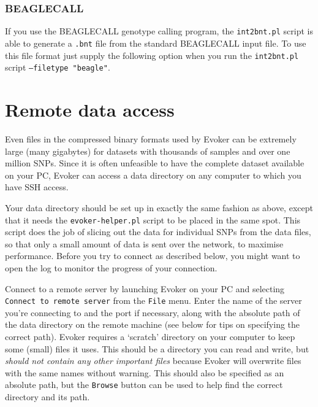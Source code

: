 \documentclass{article}
\begin{document}
\subsubsection{BEAGLECALL}
If you use the BEAGLECALL genotype calling program, the \texttt{int2bnt.pl} script is able to generate a \texttt{.bnt} file from the standard BEAGLECALL input file. To use this file format just supply the following option when you run the \texttt{int2bnt.pl} script \texttt{--filetype "beagle"}.

\section{Remote data access}

Even files in the compressed binary formats used by Evoker can be extremely large (many gigabytes) for datasets with thousands of samples and over one million SNPs. Since it is often unfeasible to have the complete dataset available on your PC, Evoker can access a data directory on any computer to which you have SSH access.

Your data directory should be set up in exactly the same fashion as above, except that it needs the \texttt{evoker-helper.pl} script to be placed in the same spot. This script does the job of slicing out the data for individual SNPs from the data files, so that only a small amount of data is sent over the network, to maximise performance. Before you try to connect as described below, you might want to open the log to monitor the progress of your connection.

Connect to a remote server by launching Evoker on your PC and selecting \texttt{Connect to remote server} from the \texttt{File} menu. Enter the name of the server you're connecting to and the port if necessary, along with the absolute path of the data directory on the remote machine (see below for tips on specifying the correct path). Evoker requires a `scratch' directory on your computer to keep some (small) files it uses. This should be a directory you can read and write, but \emph{should not contain any other important files} because Evoker will overwrite files with the same names without warning. This should also be specified as an absolute path, but the \texttt{Browse} button can be used to help find the correct directory and its path.
\end{document}

